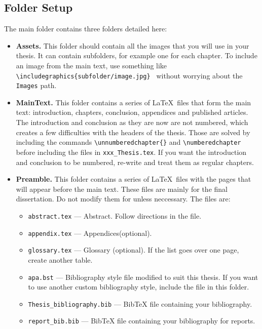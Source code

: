 \subsection{Folder Setup}
The main folder contains three folders detailed here:
\begin{itemize}

    \item \textbf{Assets.} This folder should contain all the images that you will use in your thesis. It can contain subfolders, for example one for each chapter. To include an image from the main text, use something like \texttt{\textbackslash includegraphics\{subfolder/image.jpg\} } without worrying about the \texttt{Images} path.

    \item \textbf{MainText.} This folder contains a series of \LaTeX\ files that form the main text: introduction, chapters, conclusion, appendices and published articles. The introduction and conclusion as they are now are not numbered, which creates a few difficulties with the headers of the thesis. Those are solved by including the commands \texttt{\textbackslash unnumberedchapter\{\}} and \texttt{\textbackslash numberedchapter} before including the files in \texttt{xxx\_Thesis.tex}. If you want the introduction and conclusion to be numbered, re-write and treat them as regular chapters.
    
    \item \textbf{Preamble.} This folder contains a series of \LaTeX\ files with the pages that will appear before the main text. These files are mainly for the final dissertation. Do not modify them for unless neccessary. The files are:
    \begin{itemize}
    \item \texttt{abstract.tex} --- Abstract. Follow directions in the file.
    \item \texttt{appendix.tex} --- Appendices(optional).
    \item \texttt{glossary.tex} --- Glossary (optional). If the list goes over one page, create another table.
    \item \texttt{apa.bst} --- Bibliography style file modified to suit this thesis. If you want to use another custom bibliography style, include the file in this folder.
    \item \texttt{Thesis\_bibliography.bib} --- BibTeX file containing your bibliography.
    \item \texttt{report\_bib.bib} --- BibTeX file containing your bibliography for reports.
    \end{itemize}
    
    \end{itemize}

